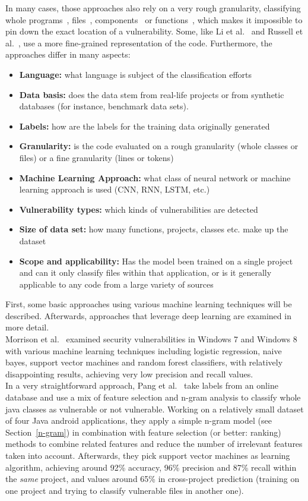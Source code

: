 \documentclass[
a4paper,
pagesize,
pdftex,
12pt,
twoside, %
BCOR=5mm, %
ngerman,
fleqn,
final,
]{scrartcl}
\begin{document}
	In many cases, those approaches also rely on a very rough granularity, classifying whole programs~\cite{Grieco.2016}, files~\cite{Shin.2010}, components~\cite{Neuhaus.2007} or functions~\cite{Yamaguchi.2011}, which makes it impossible to pin down the exact location of a vulnerability. Some, like Li et al.~\cite{Li.2018} and Russell et al.~\cite{Russell.2018}, use a more fine-grained representation of the code. Furthermore, the approaches differ in many aspects:
	\begin{itemize}
		\item \textbf{Language:} what language is subject of the classification efforts
		\item \textbf{Data basis:} does the data stem from real-life projects or from synthetic databases (for instance, benchmark data sets).
		\item \textbf{Labels:} how are the labels for the training data originally generated
		\item \textbf{Granularity:} is the code evaluated on a rough granularity (whole classes or files) or a fine granularity (lines or tokens)
		\item \textbf{Machine Learning Approach:} what class of neural network or machine learning approach is used (CNN, RNN, LSTM, etc.)
		\item \textbf{Vulnerability types:} which kinds of vulnerabilities are detected
		\item \textbf{Size of data set:} how many functions, projects, classes etc. make up the dataset
		\item \textbf{Scope and applicability:} Has the model been trained on a single project and can it only classify files within that application, or is it generally applicable to any code from a large variety of sources
	\end{itemize}
	First, some basic approaches using various machine learning techniques will be described. Afterwards, approaches that leverage deep learning are examined in more detail.\\
	Morrison et al.~\cite{Morrison.2015} examined security vulnerabilities in Windows 7 and Windows 8 with various machine learning techniques including logistic regression, naive bayes, support vector machines and random forest classifiers, with relatively disappointing results, achieving very low precision and recall values.\\
	In a very straightforward approach, Pang et al.~\cite{Pang.2015} take labels from an online database and use a mix of feature selection and n-gram analysis to classify whole java classes as vulnerable or not vulnerable. Working on a relatively small dataset of four Java android applications, they apply a simple n-gram model (see Section~\ref{n-gram}) in combination with feature selection (or better: ranking) methods to combine related features and reduce the number of irrelevant features taken into account. Afterwards, they pick support vector machines as learning algorithm, achieving around 92\% accuracy, 96\% precision and 87\% recall within the \textit{same} project, and values around 65\% in cross-project prediction (training on one project and trying to classify vulnerable files in another one).\\
\end{document}
